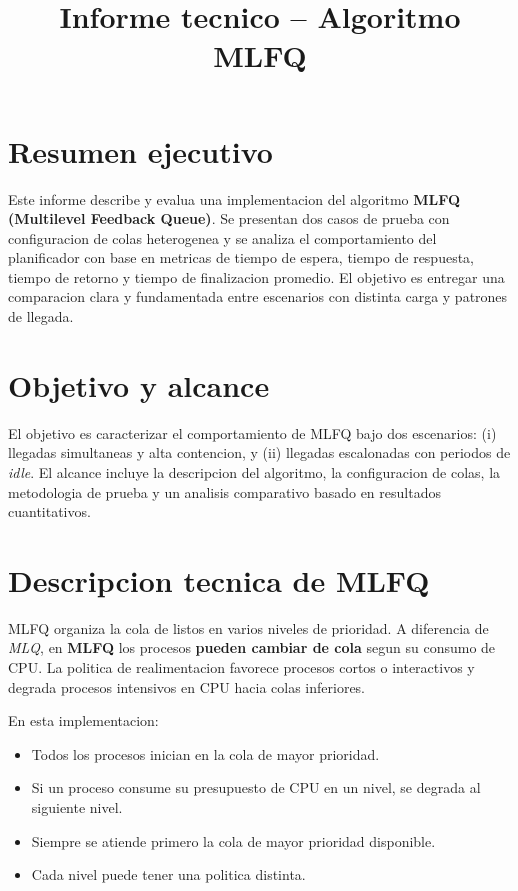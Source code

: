 \documentclass[12pt,a4paper]{article}
\title{Informe tecnico -- Algoritmo MLFQ}
\author{}
\date{}
\begin{document}
\maketitle

\section{Resumen ejecutivo}

Este informe describe y evalua una implementacion del algoritmo \textbf{MLFQ (Multilevel Feedback Queue)}. Se presentan dos casos de prueba con configuracion de colas heterogenea y se analiza el comportamiento del planificador con base en metricas de tiempo de espera, tiempo de respuesta, tiempo de retorno y tiempo de finalizacion promedio. El objetivo es entregar una comparacion clara y fundamentada entre escenarios con distinta carga y patrones de llegada.

\section{Objetivo y alcance}

El objetivo es caracterizar el comportamiento de MLFQ bajo dos escenarios: (i) llegadas simultaneas y alta contencion, y (ii) llegadas escalonadas con periodos de \textit{idle}. El alcance incluye la descripcion del algoritmo, la configuracion de colas, la metodologia de prueba y un analisis comparativo basado en resultados cuantitativos.

\section{Descripcion tecnica de MLFQ}

MLFQ organiza la cola de listos en varios niveles de prioridad. A diferencia de \textit{MLQ}, en \textbf{MLFQ} los procesos \textbf{pueden cambiar de cola} segun su consumo de CPU. La politica de realimentacion favorece procesos cortos o interactivos y degrada procesos intensivos en CPU hacia colas inferiores.

En esta implementacion:
\begin{itemize}[leftmargin=1.5cm]
    \item Todos los procesos inician en la cola de mayor prioridad.
    \item Si un proceso consume su presupuesto de CPU en un nivel, se degrada al siguiente nivel.
    \item Siempre se atiende primero la cola de mayor prioridad disponible.
    \item Cada nivel puede tener una politica distinta.
\end{itemize}
\end{document}
